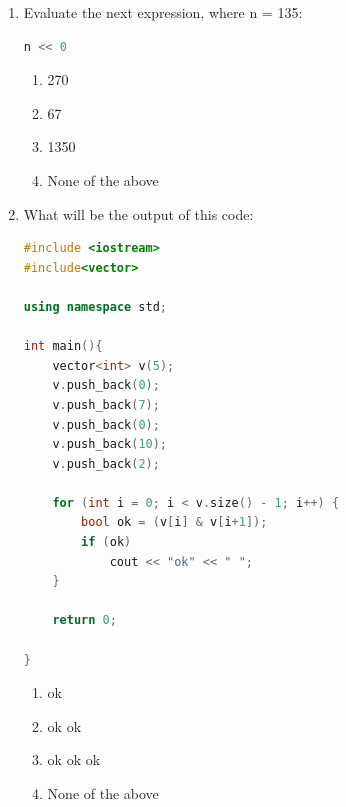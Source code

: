 \documentclass[10pt]{article}
\begin{document}
\begin{enumerate}
\begin{lstlisting}[language=C++]
\end{lstlisting}
\begin{multicols}{4}
\begin{enumerate}
    \item 5040
    \item 720
    \item 105
    \item 28
\end{enumerate}
\end{multicols}








\item Evaluate the next expression, where n = 135:
\begin{lstlisting}[language=C++]
n << 0
\end{lstlisting}
\begin{multicols}{4}
\begin{enumerate}
    \item 270
    \item 67
    \item 1350
    \item None of the above
\end{enumerate}
\end{multicols}








\item What will be the output of this code:
\begin{lstlisting}[language=C++]
#include <iostream>
#include<vector>

using namespace std;

int main(){
    vector<int> v(5);
    v.push_back(0);
    v.push_back(7);
    v.push_back(0);
    v.push_back(10);
    v.push_back(2);
    
    for (int i = 0; i < v.size() - 1; i++) {
        bool ok = (v[i] & v[i+1]);
        if (ok)
            cout << "ok" << " ";
    }

    return 0;

}


\end{lstlisting}
\begin{multicols}{4}
\begin{enumerate}
    \item ok
    \item ok ok
    \item ok ok ok
    \item None of the above
\end{enumerate}
\end{multicols}










\end{enumerate}
\end{document}
